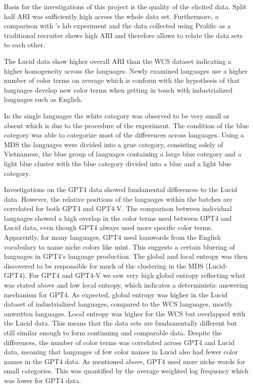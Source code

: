Basis for the investigations of this project is the quality of the elicited data. Split half ARI was sufficiently high across the whole data set. Furthermore, a comparison with \textcite{lindseyColor2014}'s lab experiment and the data collected using Prolific as a traditional recruiter shows high ARI and therefore allows to relate the data sets to each other.

The Lucid data show higher overall ARI than the WCS dataset indicating a higher homogeneity across the languages. Newly examined languages use a higher number of color terms on average which is conform with the hypothesis of \textcite{berlinBasic1969} that languages develop new color terms when getting in touch with industrialized languages such as English.

In the single languages the white category was observed to be very small or absent which is due to the procedure of the experiment. The condition of the blue category was able to categorize most of the differences across languages. Using a MDS the languages were divided into a grue category, consisting solely of Vietnamese, the blue group of languages containing a large blue category and a light blue cluster with the blue category divided into a blue and a light blue category.

Investigations on the GPT4 data showed fundamental differences to the Lucid data. However, the relative positions of the languages within the batches are correlated for both GPT4 and GPT4-V. The comparison between individual languages showed a high overlap in the color terms used between GPT4 and Lucid data, even though GPT4 always used more specific color terms. Apparently, for many languages, GPT4 used loanwords from the English vocabulary to name niche colors like mint. This suggests a certain blurring of languages in GPT4's language production. The global and local entropy was then discovered to be responsible for much of the clustering in the MDS (Lucid-GPT4). For GPT4 and GPT4-V we saw very high global entropy reflecting what was stated above and low local entropy, which indicates a deterministic answering mechanism for GPT4. As expected, global entropy was higher in the Lucid dataset of industrialized languages, compared to the WCS languages, mostly unwritten languages. Local entropy was higher for the WCS but overlapped with the Lucid data. This means that the data sets are fundamentally different but still similar enough to form continuing and comparable data. Despite the differences, the number of color terms was correlated across GPT4 and Lucid data, meaning that languages of few color names in Lucid also had fewer color names in the GPT4 data. As mentioned above, GPT4 used more niche words for small categories. This was quantified by the average weighted log frequency which was lower for GPT4 data.


